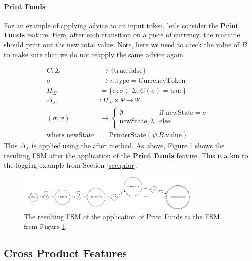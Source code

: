 \documentclass[sigplan,anonymous,review]{acmart}
\begin{document}
\paragraph{Print Funds} For an example of applying advice to an input token, let's consider the \textbf{Print Funds} feature. Here, after each transition on a piece of currency, the machine should print out the new total value. Note, here we need to check the value of $B$ to make sure that we do not reapply the same advice again.

\begin{align*}
C: \Sigma &\rightarrow \{\mathrm{true},\mathrm{false}\}\\
\sigma &\mapsto \sigma.\text{type} = \text{CurrencyToken} \\
\Pi_\Sigma &= \{\sigma: \sigma \in \Sigma, C(\sigma) = \mathrm{true}\}\\
\Delta_\Sigma &: \Pi_\Sigma \times \Psi \rightarrow \Psi\\
(\sigma, \psi) &\rightarrow \begin{cases}
    \emptyset & \text{if newState} = \sigma\\
    \text{newState}, \lambda & \text{else}\\
\end{cases}\\
\text{where newState} &= \text{PrinterState}(\psi.B.\text{value})
\end{align*}
This $\Delta_\Sigma$ is applied using the after method. As above, Figure \ref{fig:vend3} shows the resulting FSM after the application of the \textbf{Print Funds} feature. This is a kin to the logging example from Section \ref{sec:prior}.

\begin{figure}
    \centering
    \includegraphics[width=0.8\textwidth]{figures/vend3.pdf}
    \caption{The resulting FSM of the application of Print Funds to the FSM from Figure \ref{fig:vend3}.}
    \label{fig:vend3}
\end{figure}

\subsection{Cross Product Features}\label{sec:cpalg}
\end{document}
